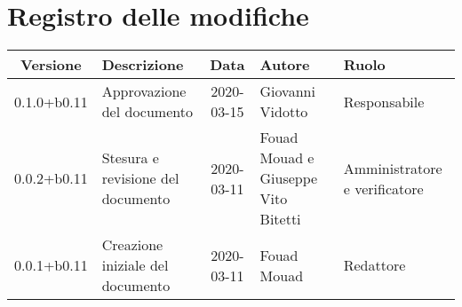 \section*{Registro delle modifiche}

\begin{center}
	\begin{longtable}{|c|p{3.5cm}|c|p{3cm}|p{3cm}|}
	\hline
	\rowcolor{lighter-grayer}
	\textbf{Versione} & \textbf{Descrizione} & \textbf{Data} & \textbf{Autore} & \textbf{Ruolo} \\
	\hline
	\endfirsthead

	0.1.0+b0.11 & Approvazione del documento & 2020-03-15 & Giovanni Vidotto & Responsabile \\
	\hline
	0.0.2+b0.11 & Stesura e revisione del documento & 2020-03-11 & Fouad Mouad e Giuseppe Vito Bitetti & Amministratore e verificatore \\
	\hline
	0.0.1+b0.11 & Creazione iniziale del documento & 2020-03-11 & Fouad Mouad & Redattore \\
	\hline

	\end{longtable}
\end{center}